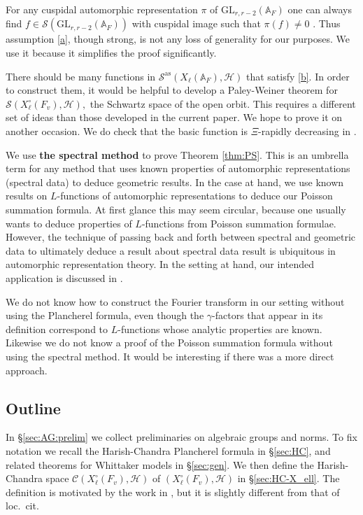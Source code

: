 \documentclass[12pt]{amsart}
\theoremstyle{remark}
\numberwithin{equation}{section}
\newcommand{\A}{\mathbb{A}}
\newcommand{\GL}{\mathrm{GL}}
\theoremstyle{definition}
\numberwithin{equation}{subsection}
\begin{document}
 For any cuspidal automorphic representation $\pi$ of $\GL_{r,r-2}(\A_F)$ one can always find $f \in \mathcal{S}(\GL_{r,r-2}(\A_F))$ with cuspidal image such that $\pi(f) \neq 0$ \cite{BPLZZ}.  Thus assumption \eqref{a}, though strong, is not any loss of generality for our purposes.  We use it because it simplifies the proof significantly.  

There should be many functions in $\mathcal{S}^{\mathrm{as}}(X_\ell(\A_F),\mathcal{H})$ that satisfy \eqref{b}.  In order to construct them, it would be helpful to develop a Paley-Weiner theorem for $\mathcal{S}(X_\ell^{\circ}(F_v),\mathcal{H}),$ the Schwartz space of the open orbit.  This requires a different set of ideas than those developed in the current paper. We hope to prove it on another occasion.  We do check that the basic function is $\Xi$-rapidly decreasing in .


We use \textbf{the spectral method} to prove Theorem \ref{thm:PS}.  
This is an umbrella term for any method that uses known properties of automorphic representations (spectral data) to deduce geometric results.  In the case at hand, we use known results on $L$-functions of automorphic representations  to deduce our Poisson summation formula.  At first glance this may seem circular, because one usually wants to deduce properties of $L$-functions from Poisson summation formulae.  However, the technique of passing back and forth between spectral and geometric data to ultimately deduce a result about spectral data result is ubiquitous in automorphic representation theory.  In the setting at hand, our intended application is discussed in \cite{GGHL}.  

We do not know how to construct the Fourier transform in our setting without using the Plancherel formula, even though the $\gamma$-factors that appear in its definition correspond to $L$-functions whose analytic properties are known.  Likewise we do not know a proof of the Poisson summation formula without using the spectral method.  It would be interesting if there was a more direct approach.

\subsection{Outline}  In \S \ref{sec:AG:prelim} we collect preliminaries on algebraic groups and norms.  To fix notation we recall the Harish-Chandra Plancherel formula in \S \ref{sec:HC}, and related theorems for Whittaker models in \S \ref{sec:gen}.  We then define the Harish-Chandra space $\mathcal{C}(X_\ell^\circ(F_v),\mathcal{H})$ of $(X_\ell^\circ(F_v),\mathcal{H})$
in \S \ref{sec:HC-X_ell}.  The definition is motivated by the work in \cite{Bernstein:Planch}, but it is slightly different from that of loc.~cit.
\end{document}
